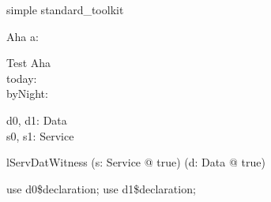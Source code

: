 \begin{zsection}
   \SECTION simple \parents standard\_toolkit
\end{zsection}

\begin{schema}{Aha}
   a: \nat
\end{schema}

\begin{schema}{Test}
   \Delta Aha \\
   today: \nat \\
   byNight: \nat
\end{schema}


\begin{zed}
\end{zed}

\begin{axdef}
   d0, d1: Data
\\
   s0, s1: Service
\end{axdef}

\begin{theorem}{lServDatWitness}
   (\exists s: Service @ true) \land (\exists d: Data @ true)
\end{theorem}

\begin{zproof}[lServDatWitness]
use d0\$declaration;
use d1\$declaration;
\end{zproof}